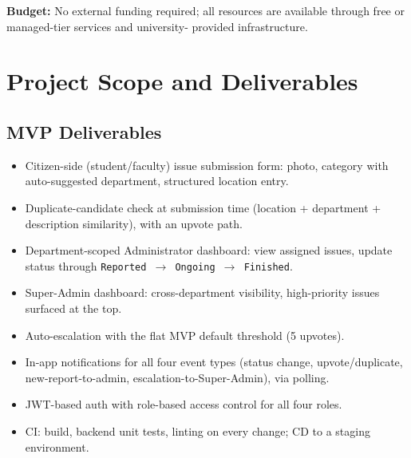 \documentclass[11pt,a4paper]{article}
\begin{document}
\vspace{1em}

\noindent\textbf{Budget:} No external funding required; all resources are
available through free or managed-tier services and university-
provided infrastructure.



\section{Project Scope and Deliverables}


\subsection{MVP Deliverables}
\begin{itemize}[leftmargin=0.7cm]
  \item Citizen-side (student/faculty) issue submission form: photo,
    category with auto-suggested department, structured location entry.
  \item Duplicate-candidate check at submission time (location +
    department + description similarity), with an upvote path.
  \item Department-scoped Administrator dashboard: view assigned
    issues, update status through \texttt{Reported $\rightarrow$
    Ongoing $\rightarrow$ Finished}.
  \item Super-Admin dashboard: cross-department visibility,
    high-priority issues surfaced at the top.
  \item Auto-escalation with the flat MVP default threshold
    (5 upvotes).
  \item In-app notifications for all four event types (status change,
    upvote/duplicate, new-report-to-admin, escalation-to-Super-Admin),
    via polling.
  \item JWT-based auth with role-based access control for all four
    roles.
  \item CI: build, backend unit tests, linting on every change; CD to a
    staging environment.
\end{itemize}
\end{document}
